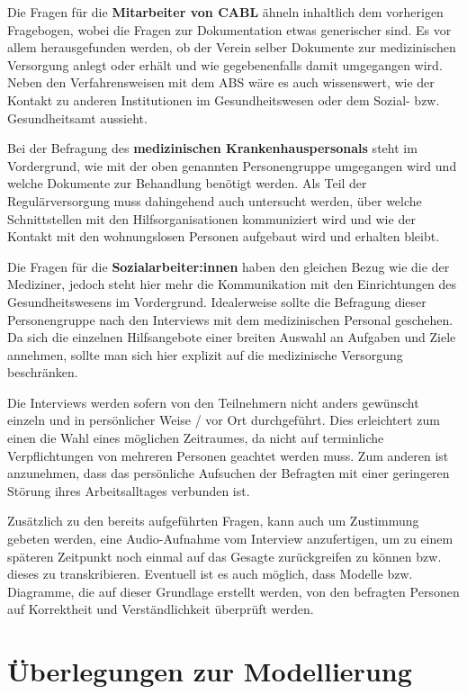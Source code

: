 Die Fragen für die \textbf{Mitarbeiter von CABL} ähneln inhaltlich dem vorherigen Fragebogen, wobei die Fragen zur Dokumentation etwas generischer sind. Es vor allem herausgefunden werden, ob der Verein selber Dokumente zur medizinischen Versorgung anlegt oder erhält und wie gegebenenfalls damit umgegangen wird. Neben den Verfahrensweisen mit dem ABS wäre es auch wissenswert, wie der Kontakt zu anderen Institutionen im Gesundheitswesen oder dem Sozial- bzw. Gesundheitsamt aussieht.

Bei der Befragung des \textbf{medizinischen Krankenhauspersonals} steht im Vordergrund, wie mit der oben genannten Personengruppe umgegangen wird und welche Dokumente zur Behandlung benötigt werden. Als Teil der Regulärversorgung muss dahingehend auch untersucht werden, über welche Schnittstellen mit den Hilfsorganisationen kommuniziert wird und wie der Kontakt mit den wohnungslosen Personen aufgebaut wird und erhalten bleibt.

Die Fragen für die \textbf{Sozialarbeiter:innen} haben den gleichen Bezug wie die der Mediziner, jedoch steht hier mehr die Kommunikation mit den Einrichtungen des Gesundheitswesens im Vordergrund. Idealerweise sollte die Befragung dieser Personengruppe nach den Interviews mit dem medizinischen Personal geschehen. Da sich die einzelnen Hilfsangebote einer breiten Auswahl an Aufgaben und Ziele annehmen, sollte man sich hier explizit auf die medizinische Versorgung beschränken.

Die Interviews werden sofern von den Teilnehmern nicht anders gewünscht einzeln und in persönlicher Weise / vor Ort durchgeführt. Dies erleichtert zum einen die Wahl eines möglichen Zeitraumes, da nicht auf terminliche Verpflichtungen von mehreren Personen geachtet werden muss. Zum anderen ist anzunehmen, dass das persönliche Aufsuchen der Befragten mit einer geringeren Störung ihres Arbeitsalltages verbunden ist.

Zusätzlich zu den bereits aufgeführten Fragen, kann auch um Zustimmung gebeten werden, eine Audio-Aufnahme vom Interview anzufertigen, um zu einem späteren Zeitpunkt noch einmal auf das Gesagte zurückgreifen zu können bzw. dieses zu transkribieren. Eventuell ist es auch möglich, dass Modelle bzw. Diagramme, die auf dieser Grundlage erstellt werden, von den befragten Personen auf Korrektheit und Verständlichkeit überprüft werden.


\section{Überlegungen zur Modellierung}

